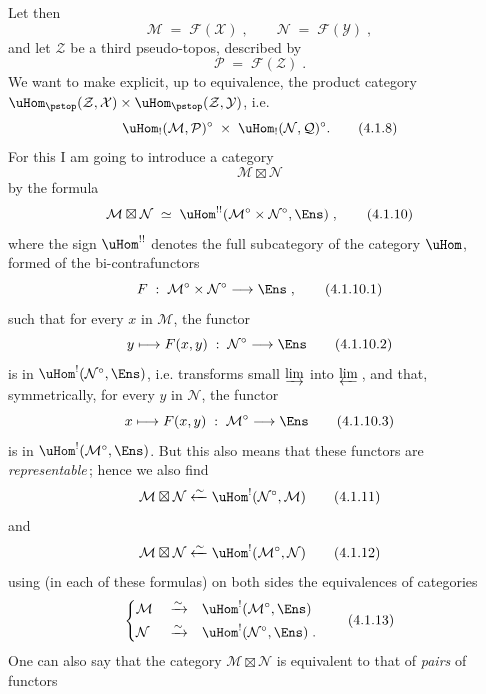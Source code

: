 Let then
\[
\mathcal{M} \;=\; \mathcal{F}(\mathcal{X})\;, \qquad \mathcal{N} \;=\; \mathcal{F}(\mathcal{Y})\;,
\tag*{(4.1.6)}
\]
and let $\mathcal{Z}$ be a third pseudo-topos, described by
\[
\mathcal{P} \;=\; \mathcal{F}(\mathcal{Z})\;.
\tag*{(4.1.7)}
\]
We want to make explicit, up to equivalence, the product category $\uHom_{\pstop}(\mathcal{Z},\mathcal{X})\times\uHom_{\pstop}(\mathcal{Z},\mathcal{Y})$, i.e.
\[
\uHom_!(\mathcal{M},\mathcal{P})^\circ \;\times\; \uHom_!(\mathcal{N},\mathcal{Q})^\circ.
\tag*{(4.1.8)}
\]%
For this I am going to introduce a category
\[
\mathcal{M}\boxtimes\mathcal{N}
\tag*{(4.1.9)}
\]
by the formula
\[
\mathcal{M}\boxtimes\mathcal{N} \;\simeq\; \uHom^{!!}(\mathcal{M}^\circ\times\mathcal{N}^\circ,\Ens)\;,
\tag*{(4.1.10)}
\]
where the sign $\uHom^{!!}$ denotes the full subcategory of the category $\uHom$, formed of the bi-contrafunctors %
\[
F \;:\; \mathcal{M}^\circ\times\mathcal{N}^\circ \longrightarrow \Ens\;,
\tag*{(4.1.10.1)}
\]
such that for every $x$ in $\mathcal{M}$, the functor
\[
y \longmapsto F(x,y) \;:\; \mathcal{N}^\circ \longrightarrow \Ens
\tag*{(4.1.10.2)}
\]
is in $\uHom^!(\mathcal{N}^\circ,\Ens)$, i.e. transforms small $\varinjlim$ into $\varprojlim$\,, and that, symmetrically, for every $y$ in $\mathcal{N}$, the functor
\[
x \longmapsto F(x,y) \;:\; \mathcal{M}^\circ \longrightarrow \Ens
\tag*{(4.1.10.3)}
\]
is in $\uHom^!(\mathcal{M}^\circ,\Ens)$. But this also means that these functors are \textit{representable}\,; hence we also find
\[
\mathcal{M}\boxtimes\mathcal{N} \xleftarrow{\sim} \uHom^!(\mathcal{N}^\circ,\mathcal{M})
\tag*{(4.1.11)}
\]
and
\[
\mathcal{M}\boxtimes\mathcal{N} \xleftarrow{\sim} \uHom^!(\mathcal{M}^\circ,\mathcal{N})
\tag*{(4.1.12)}
\]
using (in each of these formulas) on both sides the equivalences of categories
\[
\left\{
\begin{aligned}
&\mathcal{M} &&\xrightarrow{\sim} &&\uHom^!(\mathcal{M}^\circ,\Ens)\\
&\mathcal{N} &&\xrightarrow{\sim} &&\uHom^!(\mathcal{N}^\circ,\Ens)\;.
\end{aligned}
\right.
\tag*{(4.1.13)}
\]
One can also say that the category $\mathcal{M}\boxtimes\mathcal{N}$ is equivalent to that of \textit{pairs} of functors
